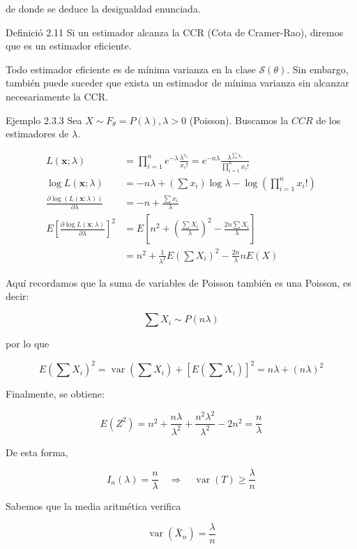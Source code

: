 \documentclass[
]{article}
\begin{document}
de donde se deduce la desigualdad enunciada.

Definició 2.11 Si un estimador alcanza la CCR (Cota de Cramer-Rao), diremos que es un estimador eficiente.

Todo estimador eficiente es de mínima varianza en la clase \(\mathcal{S}(\theta)\). Sin embargo, también puede suceder que exista un estimador de mínima varianza sin alcanzar necesariamente la CCR.

Ejemplo 2.3.3 Sea \(X \sim F_{\theta}=P(\lambda), \lambda>0\) (Poisson). Buscamos la \(C C R\) de los estimadores de \(\lambda\).

\[
\begin{aligned}
L(\mathbf{x} ; \lambda) & =\prod_{i=1}^{n} e^{-\lambda} \frac{\lambda^{x_{i}}}{x_{i}!}=e^{-n \lambda} \frac{\lambda^{\sum x_{i}}}{\prod_{i=1}^{n} x_{i}!} \\
\log L(\mathbf{x} ; \lambda) & =-n \lambda+\left(\sum x_{i}\right) \log \lambda-\log \left(\prod_{i=1}^{n} x_{i}!\right) \\
\frac{\partial \log (L(\mathbf{x} ; \lambda))}{\partial \lambda} & =-n+\frac{\sum x_{i}}{\lambda} \\
E\left[\frac{\partial \log L(\mathbf{x} ; \lambda)}{\partial \lambda}\right]^{2} & =E\left[n^{2}+\left(\frac{\sum X_{i}}{\lambda}\right)^{2}-\frac{2 n \sum X_{i}}{\lambda}\right] \\
& =n^{2}+\frac{1}{\lambda^{2}} E\left(\sum X_{i}\right)^{2}-\frac{2 n}{\lambda} n E(X)
\end{aligned}
\]

Aquí recordamos que la suma de variables de Poisson también es una Poisson, es decir:

\[
\sum X_{i} \sim P(n \lambda)
\]

por lo que

\[
E\left(\sum X_{i}\right)^{2}=\operatorname{var}\left(\sum X_{i}\right)+\left[E\left(\sum X_{i}\right)\right]^{2}=n \lambda+(n \lambda)^{2}
\]

Finalmente, se obtiene:

\[
E\left(Z^{2}\right)=n^{2}+\frac{n \lambda}{\lambda^{2}}+\frac{n^{2} \lambda^{2}}{\lambda^{2}}-2 n^{2}=\frac{n}{\lambda}
\]

De esta forma,

\[
I_{n}(\lambda)=\frac{n}{\lambda} \quad \Longrightarrow \quad \operatorname{var}(T) \geq \frac{\lambda}{n}
\]

Sabemos que la media aritmética verifica

\[
\operatorname{var}\left(\bar{X}_{n}\right)=\frac{\lambda}{n}
\]
\end{document}
